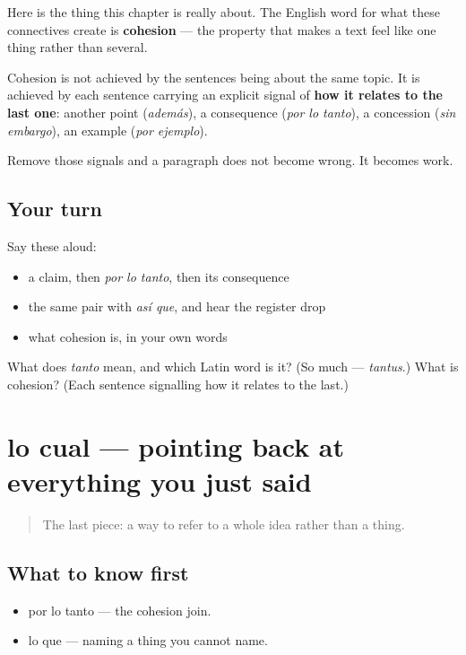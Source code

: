 \begin{grammarlens}[title={What you've built}]
Here is the thing this chapter is really about. The English word for what these connectives create is \textbf{cohesion} — the property that makes a text feel like one thing rather than several.

Cohesion is not achieved by the sentences being about the same topic. It is achieved by each sentence carrying an explicit signal of \textbf{how it relates to the last one}: another point (\emph{además}), a consequence (\emph{por lo tanto}), a concession (\emph{sin embargo}), an example (\emph{por ejemplo}).

Remove those signals and a paragraph does not become wrong. It becomes work.
\end{grammarlens}

\subsection*{Your turn}
Say these aloud:

\begin{itemize}
\raggedright
  \item a claim, then \emph{por lo tanto}, then its consequence
  \item the same pair with \emph{así que}, and hear the register drop
  \item what cohesion is, in your own words
\end{itemize}

\begin{tcolorbox}[breakable,colback=teal!4,colframe=teal!35!black,title={Before you move on}]
What does \emph{tanto} mean, and which Latin word is it? (So much — \emph{tantus}.) What is cohesion? (Each sentence signalling how it relates to the last.)
\end{tcolorbox}
\section[lo cual]{lo cual — pointing back at everything you just said}

\label{lesson:ES-C273-lo-cual}



\begin{quote}
The last piece: a way to refer to a whole idea rather than a thing.
\end{quote}

\subsection*{What to know first}
\begin{itemize}
\raggedright
  \item por lo tanto — the cohesion join.
  \item lo que — naming a thing you cannot name.
\end{itemize}

